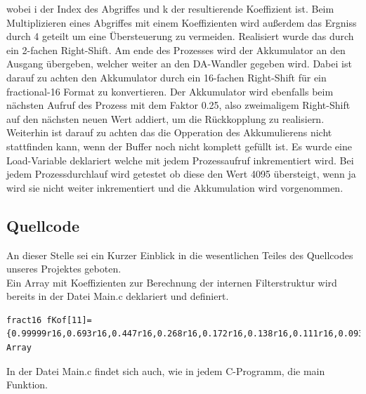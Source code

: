 \documentclass[a4paper,12pt,fontsize=12,DIV=12]{scrartcl}
\begin{document}
wobei i der Index des Abgriffes und k der resultierende Koeffizient ist.
Beim Multiplizieren eines Abgriffes mit einem Koeffizienten wird außerdem das Ergniss durch 4 geteilt um eine Übersteuerung zu vermeiden. Realisiert wurde das durch ein 2-fachen Right-Shift.
Am ende des Prozesses wird der Akkumulator an den Ausgang übergeben, welcher weiter an den DA-Wandler gegeben wird. Dabei ist darauf zu achten den Akkumulator durch ein 16-fachen Right-Shift für ein fractional-16 Format zu konvertieren.
Der Akkumulator wird ebenfalls beim nächsten Aufruf des Prozess mit dem Faktor 0.25, also zweimaligem Right-Shift auf den nächsten neuen Wert addiert, um die Rückkopplung zu realisiern.
Weiterhin ist darauf zu achten das die Opperation des Akkumulierens nicht stattfinden kann, wenn der Buffer noch nicht komplett gefüllt ist. Es wurde eine Load-Variable deklariert welche mit jedem Prozessaufruf inkrementiert wird. Bei jedem Prozessdurchlauf wird getestet ob diese den Wert 4095 übersteigt, wenn ja wird sie nicht weiter inkrementiert und die Akkumulation wird vorgenommen.

\subsection{Quellcode}
An dieser Stelle sei ein Kurzer Einblick in die wesentlichen Teiles des Quellcodes unseres Projektes geboten.
 \\
\newline
Ein Array mit Koeffizienten zur Berechnung der internen Filterstruktur wird bereits in der Datei Main.c deklariert und definiert.
\newline%

\begin{lstlisting}[title=Koeffizientenarray Dekleration \& Definition in Main.c]
fract16 fKof[11]={0.99999r16,0.693r16,0.447r16,0.268r16,0.172r16,0.138r16,0.111r16,0.093r16,0.077r16,0.066r16,0.053r16};//Koeffizienten Array 
\end{lstlisting}

\newpage
In der Datei Main.c findet sich auch, wie in jedem C-Programm, die main Funktion.
\end{document}
